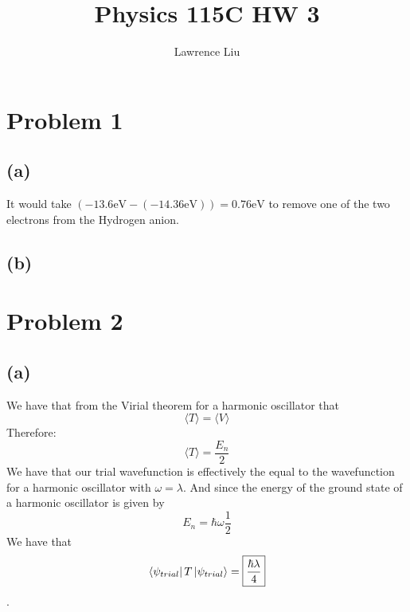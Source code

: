 \documentclass[11pt]{article}
\author{Lawrence Liu}
\title{Physics 115C HW 3}
\begin{document}
\maketitle
\section*{Problem 1}
\subsection*{(a)}
It would take $(-13.6\text{eV} - (-14.36 \text{eV})) = 0.76\text{eV}$ to remove one of the 
two electrons from the Hydrogen anion.
\subsection*{(b)}
\section*{Problem 2}
\subsection*{(a)}
We have that from the Virial theorem for a 
harmonic oscillator that
$$\langle T\rangle = \langle V\rangle$$
Therefore:
$$\langle T \rangle =  \frac{E_n}{2}$$
We have that our trial wavefunction is effectively the 
equal to the wavefunction for a harmonic oscillator with
$\omega=\lambda$. And since the energy of the ground state of a 
harmonic oscillator is given by
$$E_n = \hbar\omega\frac{1}{2}$$
We have that
$$\bra{\psi_{trial}}T\ket{\psi_{trial}} = \boxed{\frac{\hbar\lambda}{4}}$$.
\end{document}
